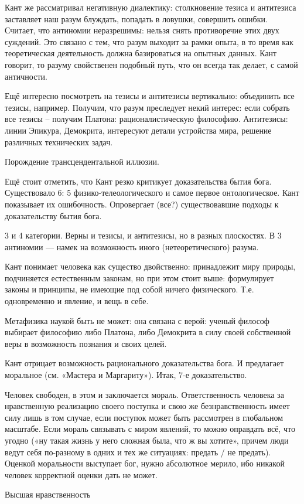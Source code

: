 Кант же рассматривал негативную диалектику: столкновение тезиса и антитезиса заставляет наш разум блуждать, попадать в ловушки, совершить ошибки. Считает, что антиномии неразрешимы: нельзя снять противоречие этих двух суждений. Это связано с тем, что разум выходит за рамки опыта, в то время как теоретическая деятельность должна базироваться на опытных данных.
Кант говорит, то разуму свойственен подобный путь, что он всегда так делает, с самой античности. 

Ещё интересно посмотреть на тезисы и антитезисы вертикально: объединить все тезисы, например. Получим, что разум преследует некий интерес: если собрать все тезисы -- получим Платона: рационалистическую философию. Антитезисы: линии Эпикура, Демокрита, интересуют детали устройства мира, решение различных технических задач.

Порождение трансцендентальной иллюзии.

Ещё стоит отметить, что Кант резко критикует доказательства бытия бога. Существовало 6: 5 физико-телеологического и самое первое онтологическое. Кант показывает их ошибочность. Опровергает (все?) существовавшие подходы к доказательству бытия бога.

3 и 4 категории. Верны и тезисы, и антитезисы, но в разных плоскостях.
В 3 антиномии --- намек на возможность иного (нетеоретического) разума.

Кант понимает человека как существо двойственно: принадлежит миру природы, подчиняется естественным законам, но при этом стоит выше: формулирует законы и принципы, не имеющие под собой ничего физического. Т.е. одновременно и явление, и вещь в себе.

Метафизика наукой быть не может: она связана с верой: ученый философ выбирает философию либо Платона, либо Демокрита в силу своей собственной веры в возможность познания и своих целей.

Кант отрицает возможность рационального доказательства бога. И предлагает моральное (см. «Мастера и Маргариту»). Итак, 7-е доказательство.

Человек свободен, в этом и заключается мораль. Ответственность человека  за нравственную реализацию своего поступка и свою же безнравственность имеет силу лишь в том случае, если поступок может быть рассмотрен в глобальном масштабе. 
Если мораль связывать с миром явлений, то можно оправдать всё, что угодно («ну такая жизнь у него сложная была, что ж вы хотите», причем люди ведут себя по-разному в одних и тех же ситуациях: предать / не предать). Оценкой моральности выступает бог, нужно абсолютное мерило, ибо никакой человек корректной оценки дать не может.

Высшая нравственность 


